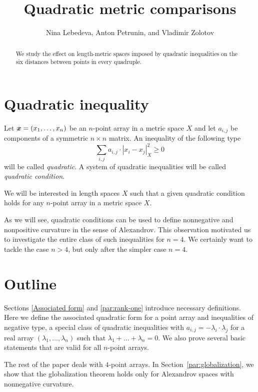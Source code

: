 \documentclass[a4paper,10pt]{article}
\def\thetitle{Quadratic metric comparisons}
\def\theauthors{Nina Lebedeva, Anton Petrunin, and Vladimir Zolotov}
\begin{document}

\title{\thetitle}
\author{\theauthors}
\date{}
\maketitle

\begin{abstract}
We study the effect on length-metric spaces imposed by quadratic inequalities on the six distances between points in every quadruple.
\end{abstract}

\section{Quadratic inequality}\label{par:quadratic-inq}

Let $\bm{x}\z=(x_1,\dots,x_n)$ be an $n$-point array in a metric space $X$ and let $a_{i,j}$ be components of a symmetric $n{\times}n$ matrix.
An inequality of the following type
\[\sum_{i,j}a_{i,j}\cdot|x_i-x_j|_X^2\ge 0\]
will be called \emph{quadratic}.
A system of quadratic inequalities will be called \emph{quadratic condition}.

We will be interested in length spaces $X$ such that a given quadratic condition holds for any $n$-point array in a metric space $X$.

As we will see, quadratic conditions can be used to define  nonnegative and nonpositive curvature in the sense of Alexandrov.
This observation motivated us to investigate the entire class of such inequalities for $n=4$.
We certainly want to tackle the case $n>4$, but only after the simpler case $n=4$.

\section{Outline}

Sections \ref{Associated form} and \ref{par:rank-one} introduce necessary definitions.
Here we define
the
associated quadratic form for a point array and inequalities of negative type, a special class of quadratic inequalities with $a_{i,j}=-\lambda_i\cdot\lambda_j$ for a real array $(\lambda_1,\dots, \lambda_n)$ such that $\lambda_1+\dots+\lambda_n=0$.
We also prove several basic statements that are valid for all $n$-point arrays.

The rest of the paper deals with $4$-point arrays.
In Section~\ref{par:globalization}, we show that the globalization theorem holds only for Alexandrov spaces with nonnegative curvature.
\end{document}

